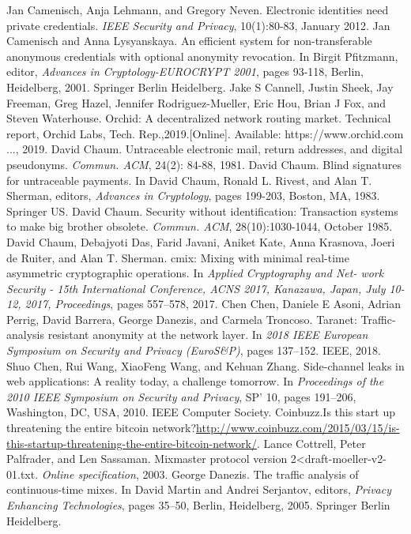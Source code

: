 \documentclass{article}
\begin{document}
\begin{thebibliography}{200}
Jan Camenisch, Anja Lehmann, and Gregory Neven. Electronic identities need private credentials. \emph{IEEE Security and Privacy}, 10(1):80-83, January 2012.
Jan Camenisch and Anna Lysyanskaya. An efficient system for non-transferable anonymous credentials with optional anonymity revocation. In Birgit Pfitzmann, editor, \emph{Advances in Cryptology-EUROCRYPT 2001}, pages 93-118, Berlin, Heidelberg, 2001. Springer Berlin Heidelberg.
Jake S Cannell, Justin Sheek, Jay Freeman, Greg Hazel, Jennifer Rodriguez-Mueller, Eric Hou, Brian J Fox, and Steven Waterhouse. Orchid: A decentralized network routing market. Technical report, Orchid Labs, Tech. Rep.,2019.[Online]. Available: https://www.orchid.com ..., 2019.
David Chaum. Untraceable electronic mail, return addresses, and digital pseudonyms. \emph{Commun. ACM}, 24(2): 84-88, 1981.
David Chaum. Blind signatures for untraceable payments. In David Chaum, Ronald L. Rivest, and Alan T. Sherman, editors, \emph{Advances in Cryptology}, pages 199-203, Boston, MA, 1983. Springer US.
David Chaum. Security without identification: Transaction systems to make big brother obsolete. \emph{Commun. ACM}, 28(10):1030-1044, October 1985.
David Chaum, Debajyoti Das, Farid Javani, Aniket Kate, Anna Krasnova, Joeri de Ruiter, and Alan T. Sherman. cmix: Mixing with minimal real-time asymmetric cryptographic operations. In \emph{Applied Cryptography and Net- work Security - 15th International Conference, ACNS 2017, Kanazawa, Japan, July 10-12, 2017, Proceedings}, pages 557–578, 2017.
Chen Chen, Daniele E Asoni, Adrian Perrig, David Barrera, George Danezis, and Carmela Troncoso. Taranet: Traffic-analysis resistant anonymity at the network layer. In \emph{2018 IEEE European Symposium on Security and Privacy (EuroS\&P)}, pages 137–152. IEEE, 2018.
Shuo Chen, Rui Wang, XiaoFeng Wang, and Kehuan Zhang. Side-channel leaks in web applications: A reality today, a challenge tomorrow. In \emph{Proceedings of the 2010 IEEE Symposium on Security and Privacy}, SP' 10, pages 191–206, Washington, DC, USA, 2010. IEEE Computer Society.
Coinbuzz.Is this start up threatening the entire bitcoin network?\url{http://www.coinbuzz.com/2015/03/15/is-this-startup-threatening-the-entire-bitcoin-network/}.
Lance Cottrell, Peter Palfrader, and Len Sassaman. Mixmaster protocol version 2<draft-moeller-v2-01.txt. \emph{Online specification}, 2003.
George Danezis. The traffic analysis of continuous-time mixes. In David Martin and Andrei Serjantov, editors, \emph{Privacy Enhancing Technologies}, pages 35–50, Berlin, Heidelberg, 2005. Springer Berlin Heidelberg.

\end{thebibliography}
\end{document}
